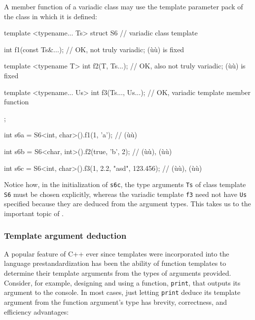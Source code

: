 A member function of a variadic class may use the template parameter
pack of the class in which it is defined:

\begin{emcppslisting}
template <typename... Ts>
struct S6                  // variadic class template
{
    int f1(const Ts&...);  // OK, not truly variadic; (ù{}ù) is fixed

    template <typename T>
    int f2(T, Ts...);      // OK, also not truly variadic; (ù{}ù) is fixed

    template <typename... Us>
    int f3(Ts..., Us...);  // OK, variadic template member function
};

int s6a = S6<int, char>().f1(1, 'a');
    // (ù{}ù)

int s6b = S6<char, int>().f2(true, 'b', 2);
    // (ù{}ù), (ù{}ù)

int s6c = S6<int, char>().f3(1, 2.2, "asd", 123.456);
    // (ù{}ù), (ù{}ù)
\end{emcppslisting}
    

\noindent Notice how, in the initialization of \lstinline!s6c!, the type arguments
\lstinline!Ts! of class template \lstinline!S6! must be chosen explicitly,
whereas the variadic template \lstinline!f3! need not have \lstinline!Us!
specified because they are deduced from the argument types. This takes
us to the important topic of .

\subsubsection[Template argument deduction]{Template argument deduction}\label{template-argument-deduction}

A popular feature of C++ ever since templates were incorporated into the
language prestandardization has been the ability of function templates
to determine their template arguments from the types of arguments
provided. Consider, for example, designing and using a function,
\lstinline!print!, that outputs its argument to the console. In most cases,
just letting \lstinline!print! deduce its template argument from the
function argument's type has brevity, correctness, and efficiency
advantages:

